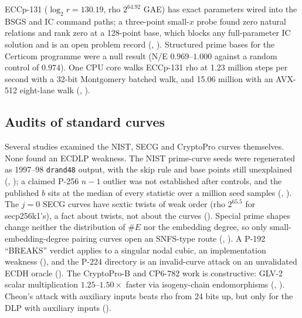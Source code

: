 ECCp-131 ($\log_2 r=130.19$, rho $2^{64.92}$ GAE) has exact parameters wired
into the BSGS and IC command paths; a three-point small-$x$ probe found zero
natural relations and rank zero at a 128-point base, which blocks any
full-parameter IC solution and is an open problem record
(,
). Structured prime
bases for the Certicom programme were a null result (N/E $0.969$--$1.000$
against a random control of $0.974$). One CPU core walks ECCp-131 rho at
1.23 million steps per second with a 32-bit Montgomery batched walk, and
15.06 million with an AVX-512 eight-lane walk
(,
).

\subsection{Audits of standard curves}

Several studies examined the NIST, SECG and CryptoPro curves themselves.
None found an ECDLP weakness. The NIST prime-curve seeds were regenerated as
1997--98 \texttt{drand48} output, with the skip rule and base points still
unexplained (,
); a claimed P-256 $n-1$
outlier was not established after controls, and the published $b$ sits at the
median of every statistic over a million seed samples
(,
). The $j=0$ SECG curves have
sextic twists of weak order (rho $2^{65.5}$ for secp256k1's), a fact about
twists, not about the curves ().
Special prime shapes change neither the distribution of $\#E$ nor the
embedding degree, so only small-embedding-degree pairing curves open an
SNFS-type route (,
). A P-192 ``BREAKS'' verdict
applies to a singular nodal cubic, an implementation weakness
(), and the P-224 directory is an
invalid-curve attack on an unvalidated ECDH oracle
(). The CryptoPro-B and CP6-782 work is
constructive: GLV-2 scalar multiplication $1.25$--$1.50\times$ faster via
isogeny-chain endomorphisms (,
). Cheon's attack with auxiliary
inputs beats rho from 24 bits up, but only for the DLP with auxiliary inputs
().

